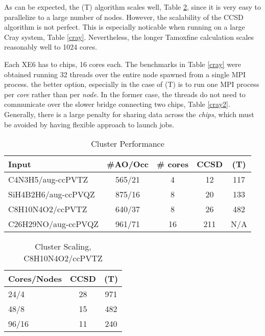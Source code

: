 \documentclass[12pt]{article} \usepackage[margin=1in]{geometry}
\begin{document}
As can be expected, the (T) algorithm scales well, Table
\ref{scaling}, since it is very easy to parallelize to a large number
of nodes. However, the scalability of the CCSD algorithm is not
perfect.  This is especially noticable when running on a large Cray
system,  Table \ref{cray}.  Nevertheless, the longer Tamoxfine calculation
scales reasonably well to 1024 cores.

 Each XE6 has to chips, 16 cores each.  The benchmarks in Table
 \ref{cray} were obtained running 32 threads over the entire node
 spawned from a single  MPI process.  the better option, especially in
 the case of (T)  is to run one MPI process per {\it core} rather than
 per {\it node}.  In the former case, the threads do not need to
 communicate over the slower bridge connecting two chips, Table
 \ref{cray2}.  Generally, there is a large penalty for sharing data
 across the {\it chips}, which  must be avoided by having flexible
 approach to launch jobs.

\begin{table}
  \label{cluster}
  \caption {Cluster Performance}
  \begin{center}
    \begin{tabular}{| l | c | c | c | c |}
      \hline
      Input                & \#AO/Occ & \# cores & CCSD & (T) \\ 
      \hline
      C4N3H5/aug-ccPVTZ    & 565/21  & 4         & 12   & 117 \\
      SiH4B2H6/aug-ccPVQZ  & 875/16  & 8         & 20   & 133 \\
      C8H10N4O2/ccPVTZ     & 640/37  & 8         & 26   & 482 \\
      C26H29NO/aug-ccPVQZ  & 961/71  & 16        & 211  & N/A \\
      \hline
    \end{tabular}
  \end{center}
\end{table}

\begin{table}
  \label{scaling}
  \caption{Cluster Scaling, C8H10N4O2/ccPVTZ}
  \begin{center}
    \begin{tabular}{| l | c | c |}
      \hline
      Cores/Nodes & CCSD & (T) \\ 
      \hline
      24/4  & 28 & 971 \\
      48/8  & 15 & 482 \\
      96/16 & 11 & 240 \\
      \hline
    \end{tabular}
  \end{center}
\end{table}
\end{document}

